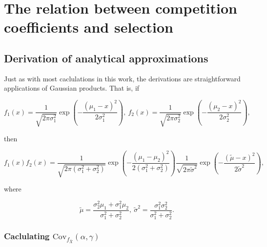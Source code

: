 \documentclass[]{article}
\begin{document}
\hypertarget{the-relation-between-competition-coefficients-and-selection}{%
\section{\texorpdfstring{The relation between competition coefficients
and selection
\label{coef_grad_moms}}{The relation between competition coefficients and selection }}\label{the-relation-between-competition-coefficients-and-selection}}

\hypertarget{derivation-of-analytical-approximations}{%
\subsection{Derivation of analytical
approximations}\label{derivation-of-analytical-approximations}}

Just as with most caclulations in this work, the derivations are
straightforward applications of Gaussian products. That is, if

\begin{equation}
f_1(x)=\frac{1}{\sqrt{2\pi\sigma_1^2}}\exp\left(-\frac{(\mu_1-x)^2}{2\sigma_1^2}\right), \ f_2(x)=\frac{1}{\sqrt{2\pi\sigma_2^2}}\exp\left(-\frac{(\mu_2-x)^2}{2\sigma_2^2}\right),
\end{equation}

then

\begin{equation}
f_1(x)f_2(x)=\frac{1}{\sqrt{2\pi(\sigma_1^2+\sigma_2^2)}}\exp\left(-\frac{(\mu_1-\mu_2)^2}{2(\sigma_1^2+\sigma_2^2)}\right)\frac{1}{\sqrt{2\pi\tilde\sigma^2}}\exp\left(-\frac{(\tilde\mu-x)^2}{2\tilde\sigma^2}\right),
\end{equation}

where

\begin{equation}
\tilde\mu=\frac{\sigma_2^2\mu_1+\sigma_1^2\mu_2}{\sigma_1^2+\sigma_2^2}, \ \tilde\sigma^2=\frac{\sigma_1^2\sigma_2^2}{\sigma_1^2+\sigma_2^2}.
\end{equation}

\hypertarget{caclulating-mathrmcov_f_bar-xalphagamma}{%
\subsubsection{\texorpdfstring{Caclulating
\(\mathrm{Cov}_{f_{\bar X}}(\alpha,\gamma)\)}{Caclulating \textbackslash{}mathrm\{Cov\}\_\{f\_\{\textbackslash{}bar X\}\}(\textbackslash{}alpha,\textbackslash{}gamma)}}\label{caclulating-mathrmcov_f_bar-xalphagamma}}
\end{document}
